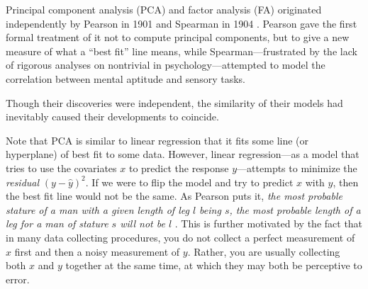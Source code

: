 Principal component analysis (PCA) and factor analysis (FA) originated independently by Pearson in 1901 and Spearman in 1904 \cite{1901pearson, 1904spearman}. Pearson gave the first formal treatment of it not to compute principal components, but to give a new measure of what a ``best fit'' line means, while Spearman---frustrated by the lack of rigorous analyses on nontrivial in  psychology---attempted to model the correlation between mental aptitude and sensory tasks. 

Though their discoveries were independent, the similarity of their models had inevitably caused their developments to coincide. 

Note that PCA is similar to linear regression that it fits some line (or hyperplane) of best fit to some data. However, linear regression---as a model that tries to use the covariates $x$ to predict the response $y$---attempts to minimize the \textit{residual} $(y - \hat{y})^2$. If we were to flip the model and try to predict $x$ with $y$, then the best fit line would not be the same. As Pearson puts it, \textit{the most probable stature of a man with a given length of leg $l$ being $s$, the most probable length of a leg for a man of stature $s$ will not be $l$} \cite{1901pearson}. This is further motivated by the fact that in many data collecting procedures, you do not collect a perfect measurement of $x$ first and then a noisy measurement of $y$. Rather, you are usually collecting both $x$ and $y$ together at the same time, at which they may both be perceptive to error. 


